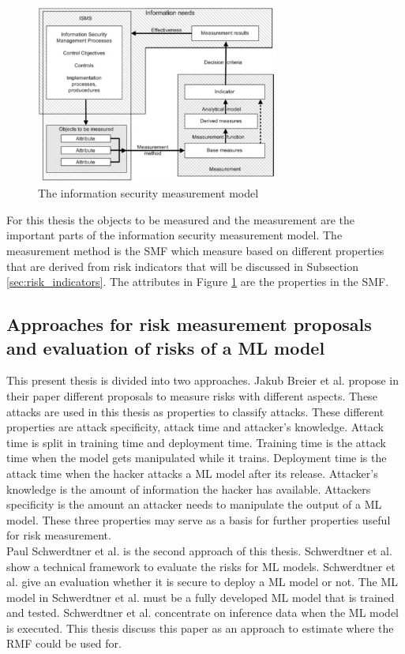 \begin{figure}[h!]
  \centering
  \includegraphics[width=8cm]{pictures/is_measurement_model.jpg}
  \caption{The information security measurement model \cite{tarnes2012information}}
  \label{fig:is_measurement_model}
\end{figure}

For this thesis the objects to be measured and the measurement are the important parts of the information security measurement model. The measurement method is the SMF which measure based
on different properties that are derived from risk indicators that will be discussed in Subsection \ref{sec:risk_indicators}. The attributes in Figure \ref{fig:is_measurement_model} are
the properties in the SMF.

\subsection{Approaches for risk measurement proposals and evaluation of risks of a ML model}
\label{sec:approaches}

This present thesis is divided into two approaches. Jakub Breier et al. \cite{DBLP:journals/corr/abs-2012-04884} propose in their paper different proposals to measure risks with different
aspects. These attacks are used in this thesis as properties to classify attacks. These different properties are attack specificity, attack time and attacker's knowledge. Attack time is
split in training time and deployment time. Training time is the attack time when the model gets manipulated while it trains. Deployment time is the attack time when the hacker attacks a
ML model after its release. Attacker's knowledge is the amount of information the hacker has available. Attackers specificity is the amount an attacker needs to manipulate the output of a
ML model. These three properties may serve as a basis for further properties useful for risk measurement. \\
Paul Schwerdtner et al. \cite{DBLP:journals/corr/abs-2011-04328} is the second approach of this thesis. Schwerdtner et al. show a technical framework to evaluate the risks for ML models.
Schwerdtner et al. give an evaluation whether it is secure to deploy a ML model or not. The ML model in Schwerdtner et al. must be a fully developed ML model that is trained and tested.
Schwerdtner et al. concentrate on inference data when the ML model is executed. This thesis discuss this paper as an approach to estimate where the RMF could be used for.

